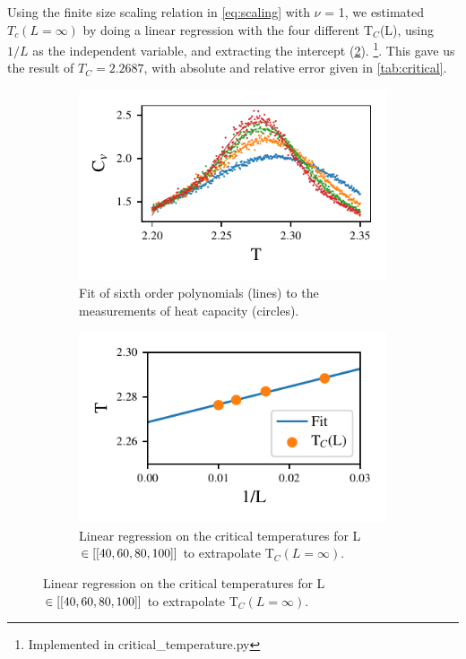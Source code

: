 Using the finite size scaling relation in
\cref{eq:scaling} with $\nu$ = 1, we estimated $T_c(L=\infty)$
by doing a linear
regression with the four different T$_C$(L), using $1/L$ as the independent
variable, and extracting the intercept (\cref{fig:lin_reg}).
\footnote{Implemented in critical\_temperature.py}.  This gave us the result of $T_C=2.2687$, with absolute and relative error
 given in \cref{tab:critical}.




 \begin{figure}[ht]
   \begin{subfigure}[t]{.5\textwidth} %
     \centering
     \includegraphics[width=\linewidth]{../figures/fit.pdf}
     \caption{Fit of sixth order polynomials (lines) to the measurements
     of heat capacity (circles).}
     \label{fig:polyfit}
   \end{subfigure}
   \hfill
   \begin{subfigure}[t]{.5\textwidth}
     \centering
     \includegraphics[width=\linewidth]{../figures/Tc_fit.pdf}
     \caption{Linear regression on the critical temperatures for L $\in \left[[40,60,80,100]\right]$
     to extrapolate T$_C(L=\infty)$.}
     \label{fig:lin_reg}
   \end{subfigure}
   \label{fig:test}
 \end{figure}




 \begin{table}[htp]
   \centering
   \caption{Results for T$_C(L=\infty)$.}
   \label{tab:critical}
 \end{table}
